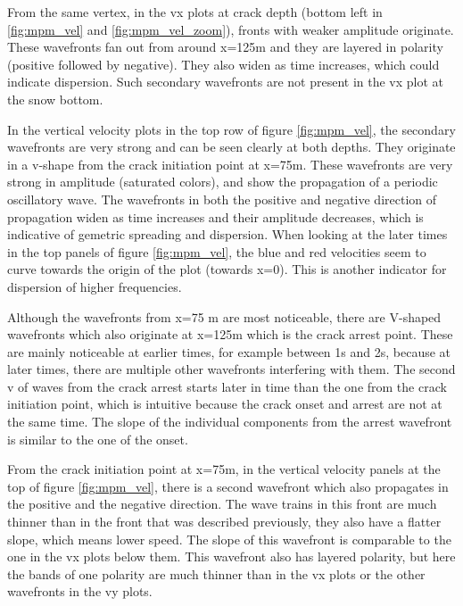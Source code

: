 From the same vertex, in the vx plots at crack depth (bottom left in \ref{fig:mpm_vel} and \ref{fig:mpm_vel_zoom}), fronts with weaker amplitude originate. These wavefronts fan out from around x=125m and they are layered in polarity (positive followed by negative). They also widen as time increases, which could indicate dispersion. Such secondary wavefronts are not present in the vx plot at the snow bottom. \par 

In the vertical velocity plots in the top row of figure \ref{fig:mpm_vel}, the secondary wavefronts are very strong and can be seen clearly at both depths. They originate in a v-shape from the crack initiation point at x=75m. These wavefronts are very strong in amplitude (saturated colors), and show the propagation of a periodic oscillatory wave. The wavefronts in both the positive and negative direction of propagation widen as time increases and their amplitude decreases, which is indicative of gemetric spreading and dispersion. When looking at the later times in the top panels of figure \ref{fig:mpm_vel}, the blue and red velocities seem to curve towards the origin of the plot (towards x=0). This is another indicator for dispersion of higher frequencies. \par

Although the wavefronts from x=75 m are most noticeable, there are V-shaped wavefronts which also originate at x=125m which is the crack arrest point. These are mainly noticeable at earlier times, for example between 1s and 2s, because at later times, there are multiple other wavefronts interfering with them. The second v of waves from the crack arrest starts later in time than the one from the crack initiation point, which is intuitive because the crack onset and arrest are not at the same time. The slope of the individual components from the arrest wavefront is similar to the one of the onset. \par

From the crack initiation point at x=75m, in the vertical velocity panels at the top of figure \ref{fig:mpm_vel}, there is a second wavefront which also propagates in the positive and the negative direction. The wave trains in this front are much thinner than in the front that was described previously, they also have a flatter slope, which means lower speed. The slope of this wavefront is comparable to the one in the vx plots below them. This wavefront also has layered polarity, but here the bands of one polarity are much thinner than in the vx plots or the other wavefronts in the vy plots. \par


